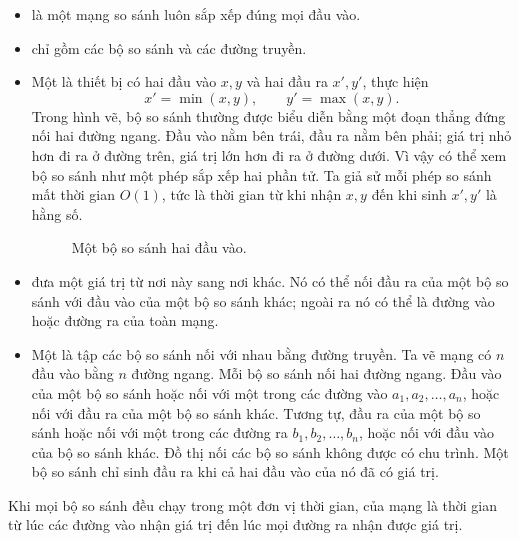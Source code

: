 \documentclass[11pt]{article}
\newcommand{\comp}[3]{%
  \draw (#1,#2) -- (#1,#3);
  \fill (#1,#2) circle (1.6pt);
  \fill (#1,#3) circle (1.6pt);
}
\begin{document}
\begin{itemize}
  \item {} là một mạng so sánh luôn sắp xếp đúng mọi đầu vào.
  \item {} chỉ gồm các bộ so sánh và các đường truyền.
  \item Một  là thiết bị có hai đầu vào $x,y$ và hai đầu ra
  $x',y'$, thực hiện
  \[
    x'=\min(x,y),\qquad y'=\max(x,y).
  \]
  Trong hình vẽ, bộ so sánh thường được biểu diễn bằng một đoạn thẳng đứng nối
  hai đường ngang. Đầu vào nằm bên trái, đầu ra nằm bên phải; giá trị nhỏ hơn
  đi ra ở đường trên, giá trị lớn hơn đi ra ở đường dưới. Vì vậy có thể xem bộ
  so sánh như một phép sắp xếp hai phần tử. Ta giả sử mỗi phép so sánh mất thời
  gian $O(1)$, tức là thời gian từ khi nhận $x,y$ đến khi sinh $x',y'$ là hằng
  số.

  \begin{figure}[ht]
  \centering
  \caption{Một bộ so sánh hai đầu vào.}
  \end{figure}
  \item {} đưa một giá trị từ nơi này sang nơi khác. Nó có thể
  nối đầu ra của một bộ so sánh với đầu vào của một bộ so sánh khác; ngoài ra
  nó có thể là đường vào hoặc đường ra của toàn mạng.
  \item Một  là tập các bộ so sánh nối với nhau bằng đường
  truyền. Ta vẽ mạng có $n$ đầu vào bằng $n$ đường ngang. Mỗi bộ so sánh nối
  hai đường ngang. Đầu vào của một bộ so sánh hoặc nối với một trong các đường
  vào $a_1,a_2,\ldots,a_n$, hoặc nối với đầu ra của một bộ so sánh khác. Tương
  tự, đầu ra của một bộ so sánh hoặc nối với một trong các đường ra
  $b_1,b_2,\ldots,b_n$, hoặc nối với đầu vào của bộ so sánh khác. Đồ thị nối
  các bộ so sánh không được có chu trình. Một bộ so sánh chỉ sinh đầu ra khi
  cả hai đầu vào của nó đã có giá trị.
\end{itemize}

Khi mọi bộ so sánh đều chạy trong một đơn vị thời gian, 
của mạng là thời gian từ lúc các đường vào nhận giá trị đến lúc mọi đường ra
nhận được giá trị.
\end{document}
